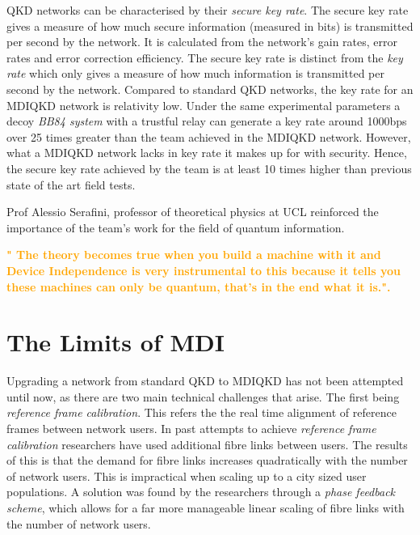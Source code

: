 \documentclass[journal]{vgtc}
\begin{document}
QKD networks can be characterised by their \textit{secure key rate}.  The secure key rate gives a measure of how much secure information (measured in bits) is transmitted per second by the network. It is calculated from the network's gain rates, error rates and error correction efficiency. The secure key rate is distinct from the \textit{key rate} which only gives a measure of how much information is transmitted per second by the network. Compared to standard QKD networks, the key rate for an MDIQKD network is relativity low. Under the same experimental parameters a decoy \textit{BB84 system} with a trustful relay can generate a key rate around 1000bps over 25 times greater than the team achieved in the MDIQKD network. However, what a MDIQKD network lacks in key rate it makes up for with security. Hence, the secure key rate achieved by the team is at least 10 times higher than previous state of the art field tests.

\vspace{0.3cm}

\noindent Prof Alessio Serafini, professor of theoretical physics at UCL reinforced the importance of the team's work for the field of quantum information.

\vspace{0.3cm}

\textcolor{orange}{\textbf{" The theory becomes true when you build a machine with it and Device Independence is very instrumental to this because it tells you these machines can only be quantum, that's in the end what it is.".}}

\section{The Limits of MDI}

Upgrading a network from standard QKD to MDIQKD has not been attempted until now, as there are two main technical challenges that arise. The first being \textit{reference frame calibration}. This refers the the real time alignment of reference frames between network users. In past attempts to achieve \textit{reference frame calibration} researchers have used additional fibre links between users. The results of this is that the demand for fibre links increases quadratically with the number of network users. This is impractical when scaling up to a city sized user populations. A solution was found by the researchers through a \textit{phase feedback scheme}, which allows for a far more manageable linear scaling of fibre links with the number of network users.
\end{document}
